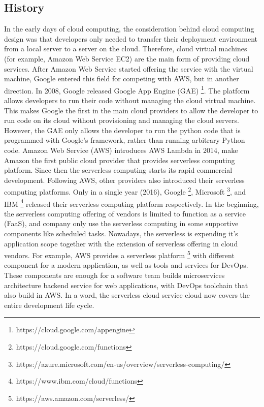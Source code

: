 \subsection{History}
In the early days of cloud computing, the consideration behind cloud computing design was that developers only needed to transfer their deployment environment from a local server to a server on the cloud. Therefore, cloud virtual machines (for example, Amazon Web Service EC2) are the main form of providing cloud services.
After Amazon Web Service started offering the service with the virtual machine, Google entered this field for competing with AWS, but in another direction.
In 2008, Google released Google App Engine (GAE) \footnote{https://cloud.google.com/appengine}\cite{zahariev2009google}. The platform allows developers to run their code without managing the cloud virtual machine. This makes Google the first in the main cloud providers to allow the developer to run code on its cloud without provisioning and managing the cloud servers. However, the GAE only allows the developer to run the python code that is programmed with Google's framework, rather than running arbitrary Python code. 
Amazon Web Service (AWS) introduces AWS Lambda in 2014, make Amazon the first public cloud provider that provides serverless computing platform\cite{Serverle77:online}. Since then the serverless computing starts its rapid commercial development. Following AWS, other providers also introduced their serverless computing platforms. Only in a single year (2016), Google \footnote{https://cloud.google.com/functions}, Microsoft \footnote{https://azure.microsoft.com/en-us/overview/serverless-computing/}, and IBM \footnote{https://www.ibm.com/cloud/functions} released their serverless computing platform respectively. 
In the beginning, the serverless computing offering of vendors is limited to function as a service (FaaS), and company only use the serverless computing in some supportive components like scheduled tasks.
Nowadays, the serverless is expending it's application scope together with the extension of serverless offering in cloud vendors. For example, AWS provides a serverless platform \footnote{https://aws.amazon.com/serverless/} with different component for a modern application, as well as tools and services for DevOps. These components are enough for a software team builds microservices architecture backend service for web applications, with DevOps toolchain that also build in AWS. In a word, the serverless cloud service cloud now covers the entire development life cycle.\label{servlessApp}
